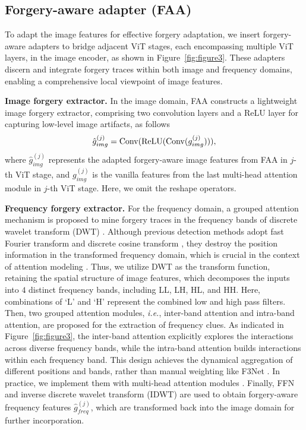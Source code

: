 \documentclass[10pt,twocolumn,letterpaper]{article}
\begin{document}
\subsection{Forgery-aware adapter (FAA)}
\label{sec:FAA}
To adapt the image features for effective forgery adaptation, we insert forgery-aware adapters to bridge adjacent ViT stages, each encompassing multiple ViT layers, in the image encoder, as shown in Figure~\ref{fig:figure3}. 
These adapters discern and integrate forgery traces within both image and frequency domains, enabling a comprehensive local viewpoint of image features.

\noindent \textbf{Image forgery extractor.}
In the image domain, FAA constructs a lightweight image forgery extractor, comprising two convolution layers and a ReLU layer for capturing low-level image artifacts, as follows
\begin{align}
    \hat{g}_{img}^{(j)} = {\rm Conv}({\rm ReLU}({\rm Conv}(g_{img}^{(j)}))),
\end{align}
where $\hat{g}_{img}^{(j)}$ represents the adapted forgery-aware image features from FAA in $j$-th ViT stage, and $g_{img}^{(j)}$ is the vanilla features from the last multi-head attention module in $j$-th ViT stage. Here, we omit the reshape operators.

\noindent \textbf{Frequency forgery extractor.}
For the frequency domain, a grouped attention mechanism is proposed to mine forgery traces in the frequency bands of discrete wavelet transform (DWT) \cite{mallat1989theory}.
Although previous detection methods \cite{jeong2022frepgan,qian2020thinking} adopt fast Fourier transform \cite{brigham1967fast} and discrete cosine transform \cite{rao2014discrete}, they destroy the position information \cite{li2020wavelet} in the transformed frequency domain, which is crucial in the context of attention modeling \cite{dosovitskiy2020image}. 
Thus, we utilize DWT as the transform function, retaining the spatial structure of image features, which decomposes the inputs into $4$ distinct frequency bands, including LL, LH, HL, and HH. 
Here, combinations of `L' and `H' represent the combined low and high pass filters.
Then, two grouped attention modules, {\em i.e.}, inter-band attention and intra-band attention, are proposed for the extraction of frequency clues. 
As indicated in Figure~\ref{fig:figure3}, the inter-band attention explicitly explores the interactions across diverse frequency bands, while the intra-band attention builds interactions within each frequency band.
This design achieves the dynamical aggregation of different positions and bands, rather than manual weighting like F3Net \cite{qian2020thinking}.
In practice, we implement them with multi-head attention modules \cite{vaswani2017attention}. Finally, FFN and inverse discrete wavelet transform (IDWT) are used to obtain forgery-aware frequency features $\hat{g}_{freq}^{(j)}$, which are transformed back into the image domain for further incorporation.
\end{document}
